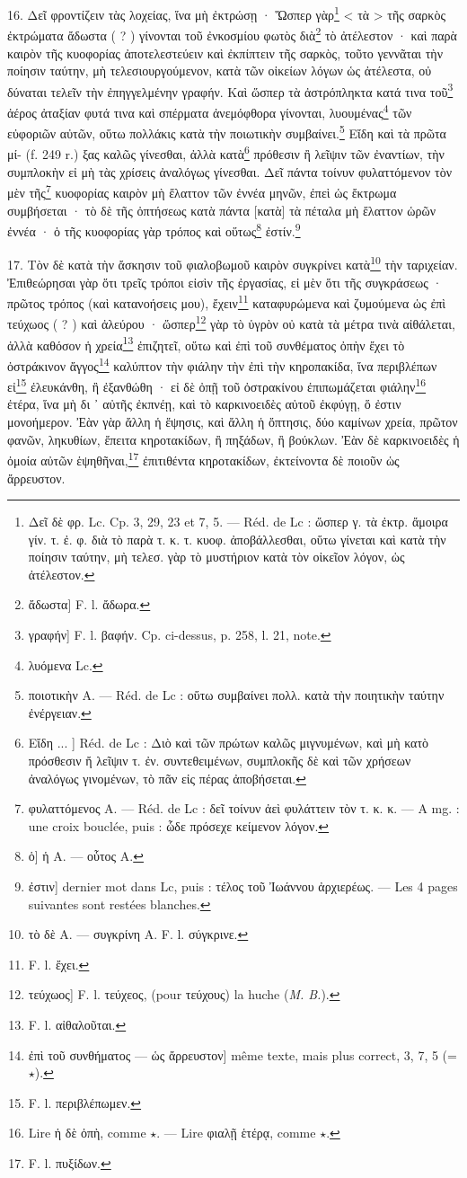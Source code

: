 \documentclass[a4paper, 11pt, oneside, polutonikogreek, french]{article}
\begin{document}
16. Δεῖ φροντίζειν τὰς λοχείας, ἵνα μὴ ἐκτρώσῃ · Ὥσπερ γὰρ\footnote{Δεῖ δὲ φρ. Lc. Cp. 3, 29, 23 et 7, 5. --- Réd. de Lc : ὥσπερ γ. τὰ ἐκτρ. ἄμοιρα γίν. τ. ἐ. φ. διὰ τὸ παρὰ τ. κ. τ. κυοφ. ἀποβάλλεσθαι, οὕτω γίνεται καὶ κατὰ τὴν ποίησιν ταύτην, μὴ τελεσ. γὰρ τὸ μυστήριον κατὰ τὸν οἰκεῖον λόγον, ὡς ἀτέλεστον.} < τὰ > τῆς σαρκὸς ἐκτρώματα ἄδωστα ( ? ) γίνονται τοῦ ἐνκοσμίου φωτὸς διὰ\footnote{ἄδωστα] F. l. ἄδωρα.} τὸ ἀτέλεστον · καὶ παρὰ καιρὸν τῆς κυοφορίας ἀποτελεστεύειν καὶ ἐκπίπτειν τῆς σαρκὸς, τοῦτο γεννᾶται τὴν ποίησιν ταύτην, μὴ τελεσιουργούμενον, κατὰ τῶν οἰκείων λόγων ὡς ἀτέλεστα, οὐ δύναται τελεῖν τὴν ἐπηγγελμένην γραφήν. Καὶ ὥσπερ τὰ ἀστρόπληκτα κατά τινα τοῦ\footnote{γραφήν] F. l. βαφήν. Cp. ci-dessus, p. 258, l. 21, note.} ἀέρος ἀταξίαν φυτά τινα καὶ σπέρματα ἀνεμόφθορα γίνονται, λυουμένας\footnote{λυόμενα Lc.} τῶν εὐφοριῶν αὐτῶν, οὕτω πολλάκις κατὰ τὴν ποιωτικὴν συμβαίνει.\footnote{ποιοτικὴν A. --- Réd. de Lc : οὕτω συμβαίνει πολλ. κατὰ τὴν ποιητικὴν ταύτην ἐνέργειαν.} Εἴδη καὶ τὰ πρῶτα μί- (f. 249 r.) ξας καλῶς γίνεσθαι, ἀλλὰ κατὰ\footnote{Εἴδη ... ] Réd. de Lc : Διὸ καὶ τῶν πρώτων καλῶς μιγνυμένων, καὶ μὴ κατὸ πρόσθεσιν ἤ λεῖψιν τ. ἐν. συντεθειμένων, συμπλοκῆς δὲ καὶ τῶν χρήσεων ἀναλόγως γινομένων, τὸ πᾶν εἰς πέρας ἀποβήσεται.} πρόθεσιν ἢ λεῖψιν τῶν ἐναντίων, τὴν συμπλοκὴν εἰ μὴ τὰς χρίσεις ἀναλόγως γίνεσθαι. Δεῖ πάντα τοίνυν φυλαττόμενον τὸν μὲν τῆς\footnote{φυλαττόμενος A. --- Réd. de Lc : δεῖ τοίνυν ἀεὶ φυλάττειν τὸν τ. κ. κ. --- A mg. : une croix bouclée, puis : ὧδε πρόσεχε κείμενον λόγον.} κυοφορίας καιρὸν μὴ ἔλαττον τῶν ἐννέα μηνῶν, ἐπεὶ ὡς ἔκτρωμα συμβήσεται · τὸ δὲ τῆς ὀπτήσεως κατὰ πάντα [κατὰ] τὰ πέταλα μὴ ἔλαττον ὡρῶν ἐννέα · ὁ τῆς κυοφορίας γὰρ τρόπος καὶ οὕτως\footnote{ὁ] ἡ A. --- οὗτος A.} ἐστίν.\footnote{ἐστιν] dernier mot dans Lc, puis : τέλος τοῦ Ἰωάννου ἀρχιερέως. --- Les 4 pages suivantes sont restées blanches.}

17. Τὸν δὲ κατὰ τὴν ἄσκησιν τοῦ φιαλοβωμοῦ καιρὸν συγκρίνει κατὰ\footnote{τὸ δὲ A. --- συγκρίνη A. F. l. σύγκρινε.} τὴν ταριχείαν. Ἐπιθεώρησαι γὰρ ὅτι τρεῖς τρόποι εἰσὶν τῆς ἐργασίας, εἰ μὲν ὅτι τῆς συγκράσεως · πρῶτος τρόπος (καὶ κατανοήσεις μου), ἔχειν\footnote{F. l. ἔχει.} καταφυρώμενα καὶ ζυμούμενα ὡς ἐπὶ τεύχωος ( ? ) καὶ ἀλεύρου · ὥσπερ\footnote{τεύχωος] F. l. τεύχεος, (pour τεύχους) la huche (\emph{M. B.}).} γὰρ τὸ ὑγρὸν οὐ κατὰ τὰ μέτρα τινὰ αἰθάλεται, ἀλλὰ καθόσον ἡ χρεία\footnote{F. l. αἰθαλοῦται.} ἐπιζητεῖ, οὕτω καὶ ἐπὶ τοῦ συνθέματος ὀπὴν ἔχει τὸ ὀστράκινον ἄγγος\footnote{ἐπὶ τοῦ συνθήματος --- ὡς ἄρρευστον] même texte, mais plus correct, 3, 7, 5 (= $\star$).} καλύπτον τὴν φιάλην τὴν ἐπὶ τὴν κηροπακίδα, ἵνα περιβλέπων εἰ\footnote{F. l. περιβλέπωμεν.} ἐλευκάνθη, ἢ ἐξανθώθη · εἰ δὲ ὀπῇ τοῦ ὀστρακίνου ἐπιπωμάζεται φιάλην\footnote{Lire ἡ δὲ ὀπὴ, comme $\star$. --- Lire φιαλῇ ἑτέρᾳ, comme $\star$.} ἐτέρα, ἵνα μὴ δι ᾽ αὐτῆς ἐκπνέῃ, καὶ τὸ καρκινοειδὲς αὐτοῦ ἐκφύγῃ, ὅ ἐστιν μονοήμερον. Ἐὰν γὰρ ἄλλη ἡ ἕψησις, καὶ ἄλλη ἡ ὄπτησις, δύο καμίνων χρεία, πρῶτον φανῶν, ληκυθίων, ἔπειτα κηροτακίδων, ἢ πηξάδων, ἢ βούκλων. Ἐὰν δὲ καρκινοειδὲς ἡ ὀμοία αὐτῶν ἑψηθῆναι,\footnote{F. l. πυξίδων.} ἐπιτιθέντα κηροτακίδων, ἐκτείνοντα δὲ ποιοῦν ὡς ἄρρευστον.
\end{document}
